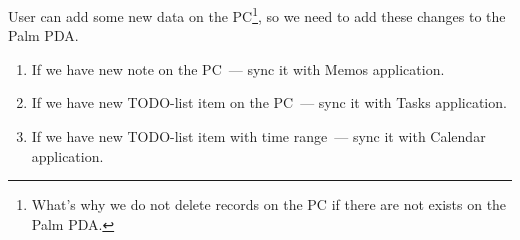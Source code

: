 \documentclass[a4paper,12pt,oneside]{scrartcl}
\begin{document}
\begin{enumerate}
  User can add some new data on the PC\footnote{What's why we do not delete
    records on the PC if there are not exists on the Palm PDA.}, so we need to
  add these changes to the Palm PDA.

  \begin{enumerate}
  \item If we have new note on the PC~--- sync it with Memos application.
  \item If we have new TODO-list item on the PC~--- sync it with Tasks
    application.
  \item If we have new TODO-list item with time range~--- sync it with Calendar
    application.
  \end{enumerate}
\end{enumerate}


\newpage

\printbibliography[heading=bibintoc]
\end{document}
